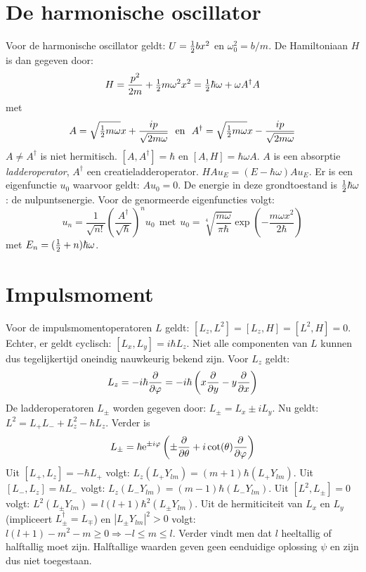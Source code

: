 \documentclass[twoside]{report}
\begin{document}
\section[~~De harmonische oscillator]{De harmonische oscillator}
Voor de harmonische oscillator geldt: $U=\mbox{$\frac{1}{2}$} bx^2$ en $\omega_0^2=b/m$. De
Hamiltoniaan $H$ is dan gegeven door:
\[
H=\frac{p^2}{2m}+\mbox{$\frac{1}{2}$} m\omega^2 x^2=\mbox{$\frac{1}{2}$}\hbar\omega+\omega A^\dagger A
\]
met
\[
A=\sqrt{\mbox{$\frac{1}{2}$} m\omega}x+\frac{ip}{\sqrt{2m\omega}}~~\mbox{en}~~
A^\dagger=\sqrt{\mbox{$\frac{1}{2}$} m\omega}x-\frac{ip}{\sqrt{2m\omega}}
\]
$A\neq A^\dagger$ is niet hermitisch. $[A,A^\dagger]=\hbar$ en
$[A,H]=\hbar\omega A$. $A$ is een absorptie {\it ladderoperator}, $A^\dagger$
een creatieladderoperator. $HAu_E=(E-\hbar\omega)Au_E$. Er is een
eigenfunctie $u_0$ waarvoor geldt: $Au_0=0$. De energie in deze grondtoestand
is $\mbox{$\frac{1}{2}$}\hbar\omega$: de nulpuntsenergie. Voor de genormeerde eigenfuncties
volgt:
\[
u_n=\frac{1}{\sqrt{n!}}\left(\frac{A^\dagger}{\sqrt{\hbar}}\right)^nu_0~~\mbox{met}~~
u_0=\sqrt[4]{\frac{m\omega}{\pi\hbar}}\exp\left(-\frac{m\omega x^2}{2\hbar}\right)
\]
met $E_n=(\mbox{$\frac{1}{2}$}+n)\hbar\omega$.

\section[~~Impulsmoment]{Impulsmoment}
Voor de impulsmomentoperatoren $L$ geldt: $[L_z,L^2]=[L_z,H]=[L^2,H]=0$.
Echter, er geldt cyclisch: $[L_x,L_y]=i\hbar L_z$. Niet alle componenten van
$L$ kunnen dus tegelijkertijd oneindig nauwkeurig bekend zijn. Voor $L_z$
geldt:
\[
L_z=-i\hbar\frac{\partial }{\partial \varphi}=-i\hbar\left(x\frac{\partial }{\partial y}-y\frac{\partial }{\partial x}\right)
\]
De ladderoperatoren $L_\pm$ worden gegeven door: $L_\pm=L_x\pm iL_y$. Nu
geldt: $L^2=L_+L_-+L_z^2-\hbar L_z$. Verder is
\[
L_\pm=\hbar{\rm e}^{\pm i\varphi}\left(\pm\frac{\partial }{\partial \theta}+i\cot(\theta)\frac{\partial }{\partial \varphi}\right)
\]
Uit $[L_+,L_z]=-\hbar L_+$ volgt: $L_z(L_+Y_{lm})=(m+1)\hbar(L_+Y_{lm})$.
\npar
Uit $[L_-,L_z]=\hbar L_-$ volgt: $L_z(L_-Y_{lm})=(m-1)\hbar(L_-Y_{lm})$.
\npar
Uit $[L^2,L_\pm]=0$ volgt: $L^2(L_\pm Y_{lm})=l(l+1)\hbar^2(L_\pm Y_{lm})$.
\npar
Uit de hermiticiteit van $L_x$ en $L_y$ (impliceert $L_\pm^\dagger=L_\mp$) en
$|L_\pm Y_{lm}|^2>0$ volgt: $l(l+1)-m^2-m\geq0\Rightarrow-l\leq m\leq l$.
Verder vindt men dat $l$ heeltallig of halftallig moet zijn. Halftallige
waarden geven geen eenduidige oplossing $\psi$ en zijn dus niet toegestaan.
\end{document}
